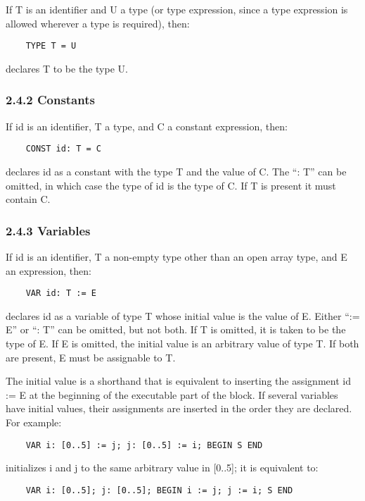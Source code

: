 \documentclass[10pt]{article}
\begin{document}
  If T is an identifier and U a type (or type expression, since a type expression is allowed wherever a type is required), then: 
\begin{verbatim}
    TYPE T = U
\end{verbatim}
 declares T to be the type U. 


 
\subsubsection*{2.4.2 Constants}


  If id is an identifier, T a type, and C a constant expression, then: 
\begin{verbatim}
    CONST id: T = C
\end{verbatim}
 declares id as a constant with the type T and the value of C. The ``: T'' can be omitted, in which case the type of id is the type of C. If T is present it must contain C. 


 
\subsubsection*{2.4.3 Variables}


  If id is an identifier, T a non-empty type other than an open array type, and E an expression, then: 
\begin{verbatim}
    VAR id: T := E
\end{verbatim}
 declares id as a variable of type T whose initial value is the value of E. Either ``:= E'' or ``: T'' can be omitted, but not both. If T is omitted, it is taken to be the type of E. If E is omitted, the initial value is an arbitrary value of type T. If both are present,  E must be assignable to T. 


 The initial value is a shorthand that is equivalent to inserting the assignment id := E at the beginning of the executable part of the block. If several variables have initial values, their assignments are inserted in the order they are declared. For example: 
\begin{verbatim}
    VAR i: [0..5] := j; j: [0..5] := i; BEGIN S END
\end{verbatim}
 initializes i and j to the same arbitrary value in [0..5]; it is equivalent to: 
\begin{verbatim}
    VAR i: [0..5]; j: [0..5]; BEGIN i := j; j := i; S END
\end{verbatim}
\end{document}
